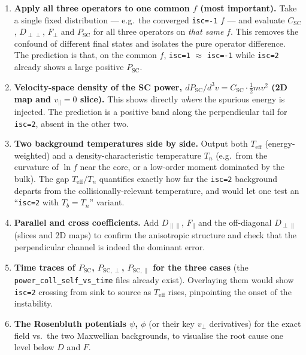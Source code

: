 \documentclass[11pt,a4paper]{article}
\begin{document}
\begin{enumerate}
  \item \textbf{Apply all three operators to one common $f$ (most important).}
        Take a single fixed distribution --- e.g.\ the converged
        \texttt{isc=-1} $f$ --- and evaluate $C_\text{SC}$, $D_{\perp\perp}$,
        $F_\perp$ and $P_\text{SC}$ for all three operators on \emph{that same}
        $f$. This removes the confound of different final states and isolates
        the pure operator difference. The prediction is that, on the common
        $f$, \texttt{isc=1} $\approx$ \texttt{isc=-1} while \texttt{isc=2}
        already shows a large positive $P_\text{SC}$.

  \item \textbf{Velocity-space density of the SC power,
        $dP_\text{SC}/d^3v = C_\text{SC}\cdot\tfrac12 m v^2$ (2D map and
        $v_\parallel=0$ slice).} This shows directly \emph{where} the spurious
        energy is injected. The prediction is a positive band along the
        perpendicular tail for \texttt{isc=2}, absent in the other two.

  \item \textbf{Two background temperatures side by side.} Output both
        $T_\text{eff}$ (energy-weighted) and a density-characteristic
        temperature $T_n$ (e.g.\ from the curvature of $\ln f$ near the core,
        or a low-order moment dominated by the bulk). The gap
        $T_\text{eff}/T_n$ quantifies exactly how far the \texttt{isc=2}
        background departs from the collisionally-relevant temperature, and
        would let one test an ``\texttt{isc=2} with $T_b = T_n$'' variant.

  \item \textbf{Parallel and cross coefficients.} Add $D_{\parallel\parallel}$,
        $F_\parallel$ and the off-diagonal $D_{\perp\parallel}$ (slices and 2D
        maps) to confirm the anisotropic structure and check that the
        perpendicular channel is indeed the dominant error.

  \item \textbf{Time traces of $P_\text{SC}$, $P_{\mathrm{SC},\perp}$,
        $P_{\mathrm{SC},\parallel}$ for the three cases} (the
        \texttt{power\_coll\_self\_vs\_time} files already exist). Overlaying
        them would show \texttt{isc=2} crossing from sink to source as
        $T_\text{eff}$ rises, pinpointing the onset of the instability.

  \item \textbf{The Rosenbluth potentials $\psi$, $\phi$} (or their key
        $v_\perp$ derivatives) for the exact field vs.\ the two Maxwellian
        backgrounds, to visualise the root cause one level below $D$ and $F$.
\end{enumerate}
\end{document}
